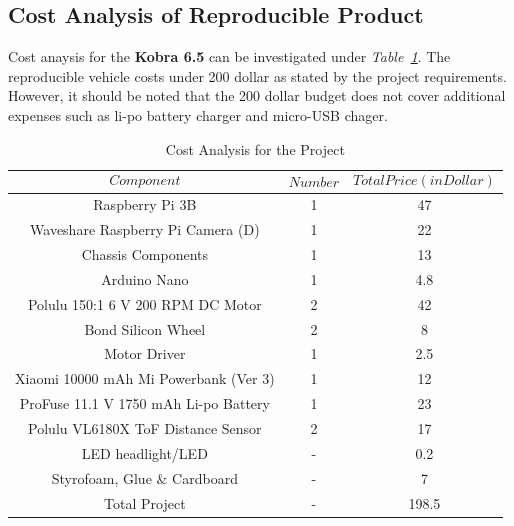 \documentclass[a4paper,12pt]{article}
\begin{document}
		
	\subsection{Cost Analysis of Reproducible Product}

	Cost anaysis for the \textbf{Kobra 6.5} can be investigated under \textit{Table~\ref{tab:cost}}. The reproducible vehicle costs under 200 dollar as stated by the project requirements. However, it should be noted that the 200 dollar budget does not cover additional expenses such as li-po battery charger and micro-USB chager.

	
	\begin{table}[H]
		\centering
		\caption{Cost Analysis for the Project}
			\begin{tabular}{c|c|c}
			$$Component$$ & $$Number$$ & $$Total Price (in Dollar)$$  \\ \hline
			Raspberry Pi 3B & 1 & 47   \\ \hline
			Waveshare Raspberry Pi Camera (D) & 1 & 22   \\ \hline
			Chassis Components & 1 & 13   \\ \hline
			Arduino Nano & 1 &  4.8 \\ \hline
			Polulu 150:1 6 V 200 RPM DC Motor & 2 & 42 \\ \hline
			Bond Silicon Wheel & 2 & 8 \\ \hline
			Motor Driver & 1 &  2.5 \\ \hline
			Xiaomi 10000 mAh Mi Powerbank (Ver 3) & 1 & 12 \\ \hline
			ProFuse 11.1 V 1750 mAh Li-po Battery  & 1 & 23 \\ \hline
			Polulu VL6180X ToF Distance Sensor & 2 & 17 \\ \hline
			LED headlight/LED & - & 0.2 \\ \hline
			Styrofoam, Glue $\&$ Cardboard & - & 7 \\ \hline
			Total Project & - & 198.5 
		\end{tabular} 
		\label{tab:cost}
	\end{table}

\end{document}
